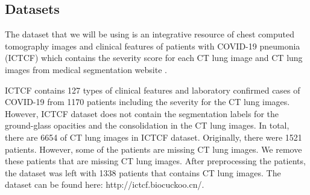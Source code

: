 \subsection{Datasets}
The dataset that we will be using is an integrative resource of chest computed tomography images and clinical features of patients with COVID-19 pneumonia (ICTCF) \cite{ref23} which contains the severity score for each CT lung image and CT lung images from medical segmentation website \cite{ref26}. 

ICTCF contains 127 types of clinical features and laboratory confirmed cases of COVID-19 from 1170 patients including the severity for the CT lung images. However, ICTCF dataset does not contain the segmentation labels for the ground-glass opacities and the consolidation in the CT lung images. In total, there are 6654 of CT lung images in ICTCF dataset. Originally, there were 1521 patients. However, some of the patients are missing CT lung images. We remove these patients that are missing CT lung images. After preprocessing the patients, the dataset was left with 1338 patients that contains CT lung images. The dataset can be found here: http://ictcf.biocuckoo.cn/. 

